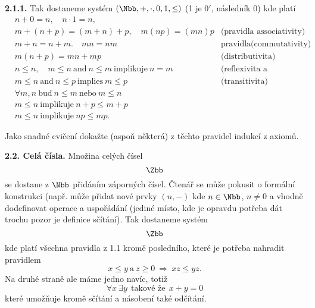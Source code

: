 \documentclass[12pt]{article}
\begin{document}
 {\bf 2.1.1.} Tak dostaneme systém
 $(\Nbb,+,\cdot,0,1,\leq)$ (1 je $0'$, následník 0) kde platí
 $$
 \begin{aligned}
 &n+0=n, \quad n\cdot 1=n,&\\
 &m+(n+p)=(m+n)+p, \quad m(np)=(mn)p &\text{(pravidla associativity)}\\
 &m+n=n+m. \quad mn=nm &\text{pravidla(commutativity)}\\
 &m(n+p)=mn+mp &\text{(distributivita)}\\
 &n\leq n,\quad m\leq n\ \text{and}\ n\leq m\ \text{implikuje} \ n=m &\text{(reflexivita a antisymetrie)}\\
 &m\leq n \ \text{and}\ n\leq p\ \text{implies}\ m\leq p &\text{(transitivita)}\\
 &\forall m,n \ \text{buď}\ n\leq m\ \text{nebo}\ m\leq n\\
 &m\leq n \  \text{implikuje} \ n+p\leq m+p\\
 &m\leq n \  \text{implikuje} \ np\leq mp.
 \end{aligned}
 $$
 
 Jako snadné cvičení dokažte (aspoň některá) z těchto pravidel indukcí z axiomů.
 
 \bigskip
 
 {\bf 2.2. Celá čísla.} Množina celých čísel
$$
 \Zbb
 $$
se dostane z $\Nbb$ přidáním záporných čísel. Čtenář se může pokusit o formální konstrukci (např. může přidat nové prvky $(n,-)$ kde $n\in \Nbb$, $n\neq 0$ a  vhodně dodefinovat operace a uspořádání (jediné místo, kde je opravdu potřeba dát trochu pozor je definice sčítání).
 Tak dostaneme systém
 $$
 \Zbb
 $$ 
 kde platí všechna pravidla z 1.1 kromě posledního, které je potřeba nahradit pravidlem
 $$
 x\leq y\ \text{a}\ z\geq 0 \ \Rightarrow\ xz\leq yz.
 $$
 Na druhé straně ale máme jedno navíc, totiž
$$
 \forall x\ \exists y\ \ \text{takov\'e \v ze}\ \ x+y=0
 $$
 které umožňuje kromě sčítání a násobení také odčítání.
 
 \bigskip
 
\end{document}
